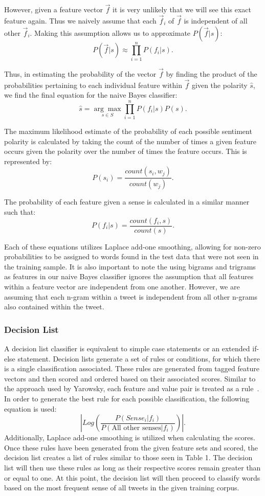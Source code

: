 \documentclass[11pt]{article}
\begin{document}
However, given a feature vector $\vec{f}$ it is very unlikely that we will see
this exact feature again. Thus we naively assume that each $\vec{f}_i$ of 
$\vec{f}$ is independent of all other $\vec{f}_i$. Making this assumption
allows us to approximate $P(\vec{f}|s)$:
\[P(\vec{f}|s)\approx{\prod_{i=1}^n}P(f_i|s).\]

Thus, in estimating the probability of the vector $\vec{f}$ by finding the
product of the probabilities pertaining to each individual feature within
$\vec{f}$ given the polarity $\hat{s}$, we find the final equation for the
naive Bayes classifier:
\[\hat{s}= \underset{{s}\in{S}}{\arg\max}{{\prod_{i=1}^n}P(f_i|s)}P(s).\]

The maximum likelihood estimate of the probability of each possible sentiment
polarity is calculated by taking the count of the number of times a given 
feature occurs given the polarity over the number of times the feature occurs. 
This is represented by:
\[P(s_i) = \frac{count(s_i,w_j)}{count(w_j)}.\]

The probability of each feature given a sense is calculated in a similar manner such that:
\[P(f_i|s) = \frac{count(f_i,s)}{count(s)}.\]

Each of these equations utilizes Laplace add-one smoothing, allowing for non-zero probabilities to be assigned to words found in the test data that were not seen in the training sample. It is also important to note the using bigrams and trigrams as features in our naive Bayes classifier ignores the assumption that all
features within a feature vector are independent from one another. However, we are assuming that each n-gram within a tweet is independent from all other n-grams also contained within the tweet.

\subsubsection*{Decision List}
A decision list classifier is equivalent to simple case statements or an extended if-else statement. Decision lists generate a set of rules or conditions, for which there is a single classification associated. These rules are generated from tagged feature vectors and then scored and ordered based on their associated scores. Similar to the approach used by Yarowsky, each feature and value pair is treated as a rule~\cite{yarowsky1994decision}. In order to generate the best rule for each possible classification, the following equation is used:
\[\left|Log\left({\frac{P(Sense_i|f_i)}{P(\text{All other senses}|f_i)}}\right)\right|.\]
\indent Additionally, Laplace add-one smoothing is utilized when calculating the scores. Once these rules have been generated from the given feature sets and scored, the decision list creates a list of rules similar to those seen in Table 1. The decision list will then use these rules as long as their respective scores remain greater than or equal to one. At this point, the decision list will then proceed to classify words based on the most frequent sense of all tweets in the given training corpus.
\end{document}
